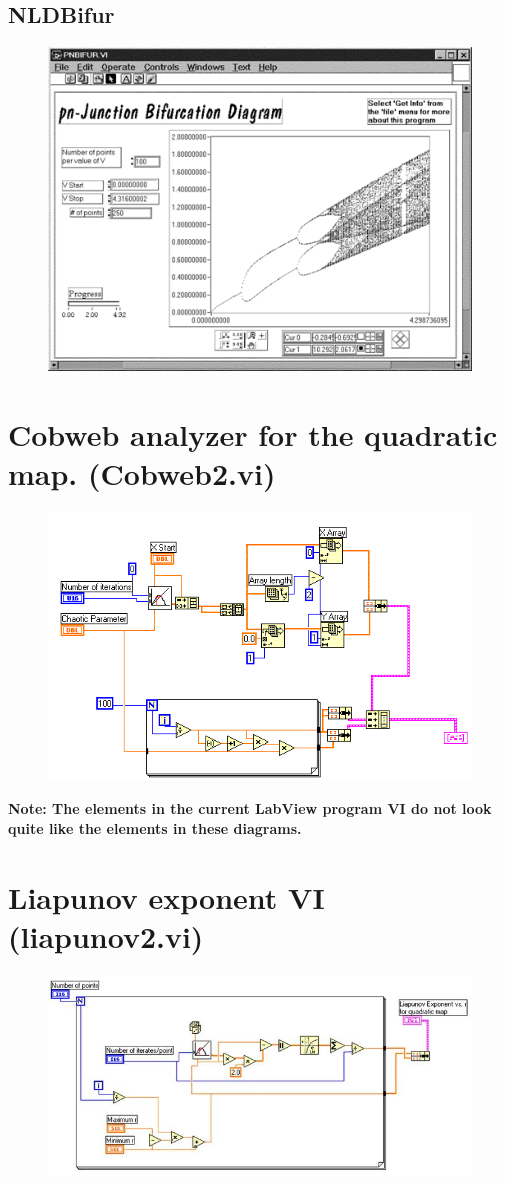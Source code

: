 \documentclass{../lab}
\begin{document}
\subsection{NLDBifur}

\begin{figure}[h]
    \centering
    \href{http://experimentationlab.berkeley.edu/sites/default/files/images/Nldimage140.gif}{\includegraphics[width=0.5\linewidth]{images/Nldimage140.png}}
    \caption{}
    \label{fig:Nldimage140}
\end{figure}

\appendix

\section{Cobweb analyzer for the quadratic map. (Cobweb2.vi)}

\begin{figure}[h]
    \centering
    \href{http://experimentationlab.berkeley.edu/sites/default/files/images/Nldimage141.gif}{\includegraphics[width=0.5\linewidth]{images/Nldimage141.png}}
    \caption{}
    \label{fig:Nldimage141}
\end{figure}

\textbf{Note: The elements in the current LabView program VI do not look quite like the elements in these diagrams.}

\section{Liapunov exponent VI (liapunov2.vi)}


\begin{figure}[h]
    \centering
    \href{http://experimentationlab.berkeley.edu/sites/default/files/images/Nldimage142.jpg}{\includegraphics[width=0.5\linewidth]{images/Nldimage142.jpg}}
    \caption{}
    \label{fig:Nldimage142}
\end{figure}
\end{document}
